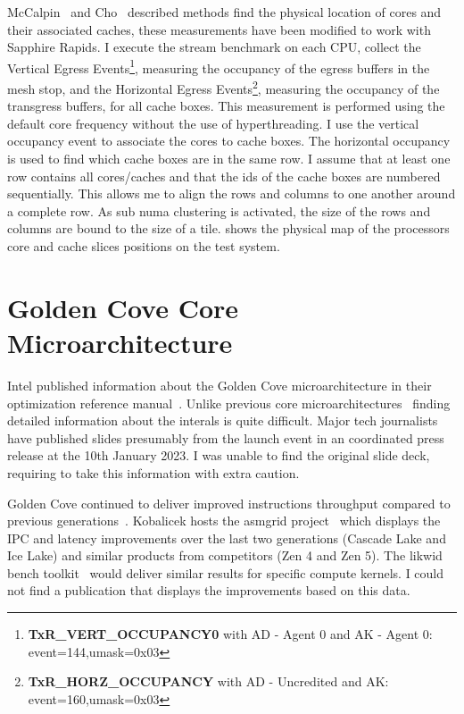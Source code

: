 McCalpin~\cite{McCalpin_2021_CoreMapping} and Cho~\cite{Cho_2022_KnowYourNeighbor} described methods find the physical location of cores and their associated caches, these measurements have been modified to work with Sapphire Rapids.
I execute the stream benchmark on each CPU, collect the Vertical Egress Events\footnote{\textbf{TxR\_VERT\_OCCUPANCY0} with AD - Agent 0 and AK - Agent 0: event=144,umask=0x03}, measuring the occupancy of the egress buffers in the mesh stop, and the Horizontal Egress Events\footnote{\textbf{TxR\_HORZ\_OCCUPANCY} with AD - Uncredited and AK: event=160,umask=0x03}, measuring the occupancy of the transgress buffers, for all cache boxes.
This measurement is performed using the default core frequency without the use of hyperthreading.
I use the vertical occupancy event to associate the cores to cache boxes.
The horizontal occupancy is used to find which cache boxes are in the same row.
I assume that at least one row contains all cores/caches and that the ids of the cache boxes are numbered sequentially.
This allows me to align the rows and columns to one another around a complete row.
As sub numa clustering is activated, the size of the rows and columns are bound to the size of a tile.
 shows the physical map of the processors core and cache slices positions on the test system.

\section{Golden Cove Core Microarchitecture}

Intel published information about the Golden Cove microarchitecture in their optimization reference manual~\cite[Sec. 2.4]{Intel_Optimization_Reference_Manual_050}.
Unlike previous core microarchitectures~\cite{Intel_2017_Skylake_SP,Intel_2020_IceLake_SP} finding detailed information about the interals is quite difficult.
Major tech journalists~\cite{ServerTheHome_2023_SPR_Press,TechGage_2023_SPR_Press,HotHardware_2023_SPR_Press,Wccftech_2023_SPR_Press} have published slides presumably from the launch event in an coordinated press release at the 10th January 2023.
I was unable to find the original slide deck, requiring to take this information with extra caution.

Golden Cove continued to deliver improved instructions throughput compared to previous generations~\cite{Intel_2021_Architecture_Day}.
Kobalicek hosts the asmgrid project~\cite{Kobalicek_AsmGrid} which displays the IPC and latency improvements over the last two generations (Cascade Lake and Ice Lake) and similar products from competitors (Zen 4 and Zen 5).
The likwid bench toolkit~\cite{RHZE_HPC_likwid} would deliver similar results for specific compute kernels.
I could not find a publication that displays the improvements based on this data.

